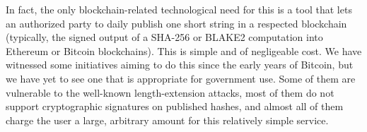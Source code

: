 
In fact, the only blockchain-related technological need for this is a tool that lets an authorized party to daily publish one short string in a respected blockchain (typically, the signed output of a SHA-256 or BLAKE2 computation into Ethereum or Bitcoin blockchains). This is simple and of negligeable cost. We have witnessed some initiatives aiming to do this since the early years of Bitcoin, but we have yet to see one that is appropriate for government use. Some of them are vulnerable to the well-known length-extension attacks, most of them do not support cryptographic signatures on published hashes, and almost all of them charge the user a large, arbitrary amount for this relatively simple service. 

